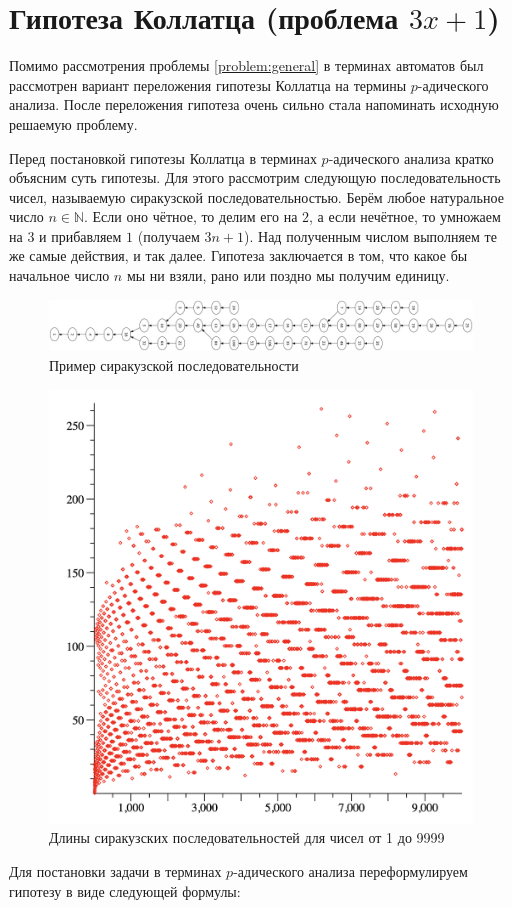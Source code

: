 \documentclass[och, master]{SCWorks}
\theoremstyle{plain}
\theoremstyle{plain}
\theoremstyle{plain}
\theoremstyle{definition}
\begin{document}
\section{Гипотеза Коллатца (проблема $3x+1$)}
Помимо рассмотрения проблемы \ref{problem:general} в терминах автоматов был рассмотрен вариант переложения гипотезы Коллатца на термины $p$-адического анализа. После переложения гипотеза очень сильно стала напоминать исходную решаемую проблему. 

Перед постановкой гипотезы Коллатца в терминах $p$-адического анализа кратко объясним суть гипотезы. Для этого рассмотрим следующую последовательность чисел, называемую сиракузской последовательностью. Берём любое натуральное число $n \in \mathbb N$. Если оно чётное, то делим его на $2$, а если нечётное, то умножаем на $3$ и прибавляем $1$ (получаем $3n + 1$). Над полученным числом выполняем те же самые действия, и так далее. Гипотеза заключается в том, что какое бы начальное число $n$ мы ни взяли, рано или поздно мы получим единицу.

\begin{figure}[H]
\centerline{\includegraphics[width=1.0\linewidth]{img/seq}}
\caption{Пример сиракузской последовательности}
\label{img:1}
\end{figure}

\begin{figure}[H]
\centerline{\includegraphics[width=0.5\linewidth]{img/len}}
\caption{Длины сиракузских последовательностей для чисел от 1 до 9999}
\label{img:2}
\end{figure}

Для постановки задачи в терминах $p$-адического анализа переформулируем гипотезу в виде следующей формулы:
\end{document}
